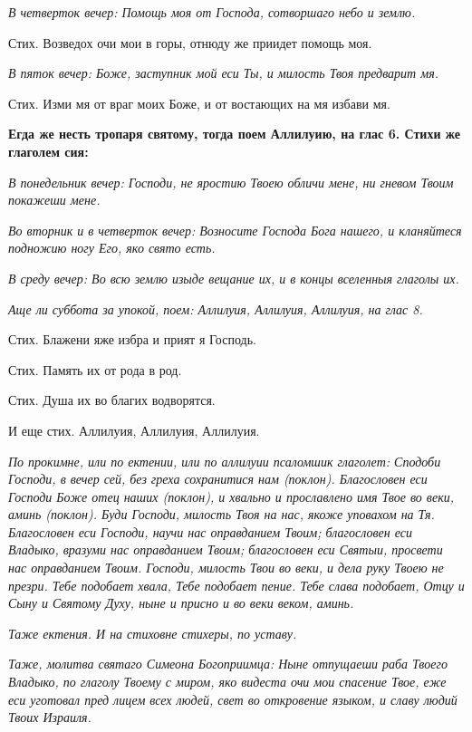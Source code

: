 \itshape В четверток вечер:\normalfont{} Помощь моя от Господа, сотворшаго небо и землю.


Стих. Возведох очи мои в горы, отнюду же приидет помощь моя.


\itshape В пяток вечер:\normalfont{} Боже, заступник мой еси Ты, и милость Твоя предварит мя.


Стих. Изми мя от враг моих Боже, и от востающих на мя избави мя.





\bfseries  Егда же несть тропаря святому, тогда поем Аллилуию, на глас 6. Стихи же глаголем сия:\normalfont{}


\itshape В понедельник вечер:\normalfont{} Господи, не яростию Твоею обличи мене, ни гневом Твоим покажеши мене.


\itshape Во вторник и в четверток вечер:\normalfont{} Возносите Господа Бога нашего, и кланяйтеся подножию ногу Его, яко свято есть.


\itshape В среду вечер:\normalfont{} Во всю землю изыде вещание их, и в концы вселенныя глаголы их.


\itshape Аще ли суббота за упокой, поем:\normalfont{} Аллилуия, Аллилуия, Аллилуия, на глас 8.


Стих. Блажени яже избра и прият я Господь.


Стих. Память их от рода в род.


Стих. Душа их во благих водворятся.


И еще стих. Аллилуия, Аллилуия, Аллилуия.


\itshape По прокимне, или по ектении, или по аллилуии псаломшик глаголет:\normalfont{} Сподоби Господи, в вечер сей, без греха сохранитися нам \itshape (поклон)\normalfont{}. Благословен еси Господи Боже отец наших \itshape (поклон)\normalfont{}, и хвально и прославлено имя Твое во веки, аминь \itshape (поклон)\normalfont{}. Буди Господи, милость Твоя на нас, якоже уповахом на Тя. Благословен еси Господи, научи нас оправданием Твоим; благословен еси Владыко, вразуми нас оправданием Твоим; благословен еси Святыи, просвети нас оправданием Твоим. Господи, милость Твои во веки, и дела руку Твоею не презри. Тебе подобает хвала, Тебе подобает пение. Тебе слава подобает, Отцу и Сыну и Святому Духу, ныне и присно и во веки веком, аминь.


\itshape Таже ектения. И на стиховне стихеры, по уставу.\normalfont{}


\itshape Таже, молитва святаго Симеона Богоприимца:\normalfont{} Ныне отпущаеши раба Твоего Владыко, по глаголу Твоему с миром, яко видеста очи мои спасение Твое, еже еси уготовал пред лицем всех людей, свет во откровение языком, и славу людий Твоих Израиля.


